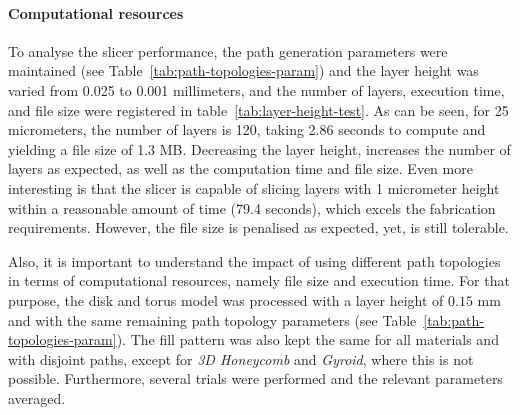 \paragraph{Computational resources}
To analyse the slicer performance, the path generation parameters were
maintained (see Table~\ref{tab:path-topologies-param}) and the layer height was varied from 0.025 to
0.001 millimeters, and the number of layers, execution time, and file size were
registered in table~\ref{tab:layer-height-test}. As can be seen, for 25
micrometers, the number of layers is 120, taking 2.86 seconds to compute and
yielding a file size of 1.3 MB. Decreasing the layer height, increases the
number of layers as expected, as well as the computation time and file
size. Even more interesting is that the slicer is capable of slicing layers with
1 micrometer height within a reasonable amount of time (79.4 seconds), which
excels the fabrication requirements. However, the file size is penalised as
expected, yet, is still tolerable.

\begin{table}[!hbt]
\centering
\caption{Layer height tests: 0.025--0.001 mm}%
\end{table}

Also, it is important to understand the impact of using different path
topologies in terms of computational resources, namely file size and execution
time. For that purpose, the disk and torus model was processed with a layer
height of $0.15$ mm and with the same remaining path topology parameters 
(see Table~\ref{tab:path-topologies-param}). The fill pattern was also
kept the same for all materials and with disjoint paths, except for \emph{3D
  Honeycomb} and \emph{Gyroid}, where this is not possible. Furthermore, several trials were performed and
the relevant parameters averaged.

